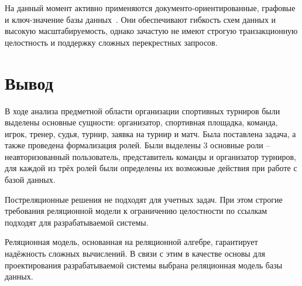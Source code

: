 На данный момент активно применяются документо-ориентированные, графовые и ключ-значение базы данных~\cite{itforprof}. Они обеспечивают гибкость схем данных и высокую масштабируемость, однако зачастую не имеют строгую транзакционную целостность и поддержку сложных перекрестных запросов.


\section*{Вывод}

В ходе анализа предметной области организации спортивных турниров были выделены основные сущности: организатор, спортивная площадка, команда, игрок, тренер, судья, турнир, заявка на турнир и матч. Была поставлена задача, а также проведена формализация ролей. Были выделены 3 основные роли -- неавторизованный пользователь, представитель команды и организатор турниров, для каждой из трёх ролей были определены их возможные действия при работе с базой данных.

Постреляционные решения не подходят для учетных задач. При этом строгие требования реляционной модели к ограничению целостности по ссылкам~\cite{kuznecov-db, intro-db-williams} подходят для разрабатываемой системы. 

Реляционная модель, основанная на реляционной алгебре, гарантирует надёжность сложных вычислений. В связи с этим в качестве основы для проектирования разрабатываемой системы выбрана реляционная модель базы данных.
\clearpage

